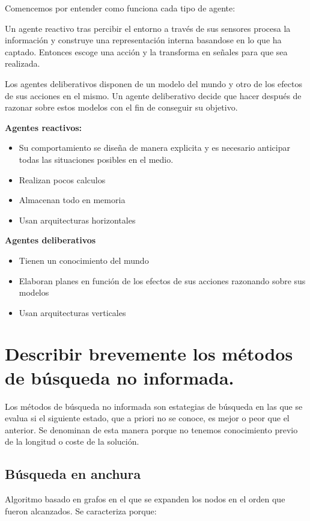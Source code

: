\documentclass[12pt]{article}
\begin{document}
Comencemos por entender como funciona cada tipo de agente:

Un agente reactivo tras percibir el entorno a través de sus sensores
procesa la información y construye una representación interna
basandose en lo que ha captado. Entonces escoge una acción y la
transforma en señales para que sea realizada.

Los agentes deliberativos disponen de un modelo del mundo y otro de
los efectos de sus acciones en el mismo. Un agente deliberativo decide
que hacer después de razonar sobre estos modelos con el fin de
conseguir su objetivo.

\textbf{Agentes reactivos:}
\begin{itemize}
\item Su comportamiento se diseña de manera explicita y es necesario
  anticipar todas las situaciones posibles en el medio.
\item Realizan pocos calculos
\item Almacenan todo en memoria
\item Usan arquitecturas horizontales
\end{itemize}

\textbf{Agentes deliberativos}
\begin{itemize}
\item Tienen un conocimiento del mundo
\item Elaboran planes en función de los efectos de sus acciones razonando sobre sus modelos
\item Usan arquitecturas verticales
\end{itemize}

\section{Describir brevemente los métodos de búsqueda no informada.}

Los métodos de búsqueda no informada son estategias de búsqueda en las
que se evalua si el siguiente estado, que a priori no se conoce, es
mejor o peor que el anterior. Se denominan de esta manera porque no
tenemos conocimiento previo de la longitud o coste de la solución.

\subsection{Búsqueda en anchura}

Algoritmo basado en grafos en el que se expanden los nodos en el orden
que fueron alcanzados. Se caracteriza porque:
\end{document}
